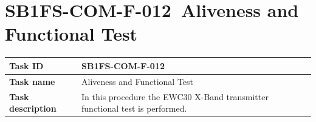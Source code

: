 \renewcommand{\reqid}{N/A}
\renewcommand{\procid}{SB1FS-COM-F-012}
\renewcommand{\procname}{Aliveness and Functional Test\xspace}

\section{\procid \ \procname} \label{sec:SB1FS-COM-F-012}
\begin{table}[H]
	\centering
	\footnotesize
	\begin{tabular}{|L{3.0cm}|L{13.0cm}|}	
		\hline
		\textbf{Task ID} & \procid \\
		\hline
		\textbf{Task name} & \procname \\
		\hline
		\textbf{Task description} & In this procedure the EWC30 X-Band transmitter functional test is performed.
		

\end{tabular}
\end{table}
